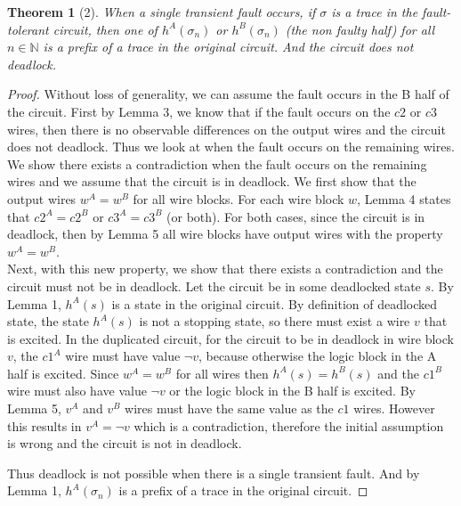 \documentclass[12pt]{report}
\newtheorem*{theorem}{Theorem}
\begin{document}
\begin{theorem}[2]
When a single transient fault occurs, if $\sigma$ is a trace in the fault-tolerant circuit, then one of $h^{A}(\sigma_n)$ or $h^{B}(\sigma_n)$ (the non faulty half) for all $n \in \mathbb{N}$ is a prefix of a trace in the original circuit.  And the circuit does not deadlock.  
\end{theorem}
\begin{proof}
Without loss of generality, we can assume the fault occurs in the B half of the circuit.  First by Lemma 3, we know that if the fault occurs on the $c2$ or $c3$ wires, then there is no observable differences on the output wires and the circuit does not deadlock.  Thus we look at when the fault occurs on the remaining wires.\\ 

We show there exists a contradiction when the fault occurs on the remaining wires and we assume that the circuit is in deadlock.  We first show that the output wires $w^A = w^B$ for all wire blocks.  For each wire block $w$, Lemma 4 states that $c2^A=c2^B$ or $c3^A=c3^B$ (or both).  For both cases, since the circuit is in deadlock, then by Lemma 5 all wire blocks have output wires with the property $w^A = w^B$.  \\%

Next, with this new property, we show that there exists a contradiction and the circuit must not be in deadlock.  Let the circuit be in some deadlocked state $s$.  By Lemma 1, $h^A(s)$ is a state in the original circuit.  By definition of deadlocked state, the state $h^A(s)$ is not a stopping state, so there must exist a wire $v$ that is excited.  In the duplicated circuit, for the circuit to be in deadlock in wire block $v$, the $c1^A$ wire must have value $\neg{v}$, because otherwise the logic block in the A half is excited.  Since $w^A = w^B$ for all wires then $h^A(s)=h^B(s)$ and the $c1^B$ wire must also have value $\neg{v}$ or the logic block in the B half is excited. By Lemma 5, $v^A$ and $v^B$ wires must have the same value as the $c1$ wires.  However this results in $v^A= \neg{v}$ which is a contradiction, therefore the initial assumption is wrong and the circuit is not in deadlock.

Thus deadlock is not possible when there is a single transient fault.  And by Lemma 1, $h^A(\sigma_n)$ is a prefix of a trace in the original circuit. 
\end{proof}
\end{document}
